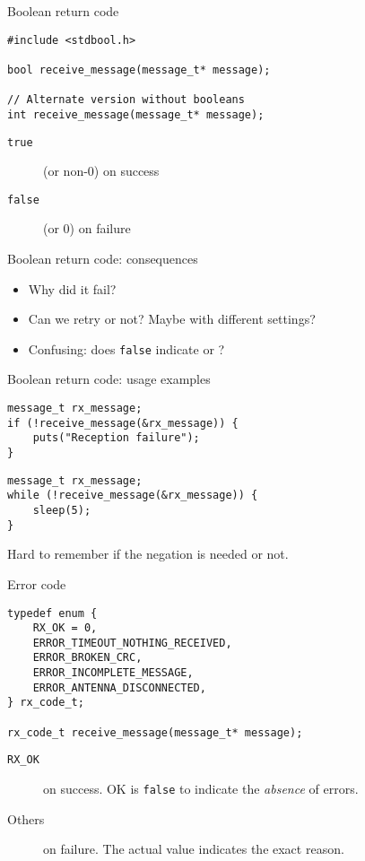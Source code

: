 \documentclass[aspectratio=169,14pt]{beamer}
\begin{document}
\begin{frame}[fragile]{Boolean return code}
\begin{lstlisting}[style=cstyle]
#include <stdbool.h>

bool receive_message(message_t* message);

// Alternate version without booleans
int receive_message(message_t* message);
\end{lstlisting}

\begin{description}
    \item[\texttt{true}] (or non-0) on success
    \item[\texttt{false}] (or 0) on failure
\end{description}
\end{frame}



\begin{frame}[fragile]{Boolean return code: consequences}
\begin{itemize}
    \item[\bad] Why did it fail?
    \item[\bad] Can we retry or not? Maybe with different settings?
    \item[\bad] Confusing: does \texttt{false} indicate  or ?
\end{itemize}
\end{frame}



\begin{frame}[fragile]{Boolean return code: usage examples}
\begin{lstlisting}[style=cstyle]
message_t rx_message;
if (!receive_message(&rx_message)) {
    puts("Reception failure");
}
\end{lstlisting}

\begin{lstlisting}[style=cstyle]
message_t rx_message;
while (!receive_message(&rx_message)) {
    sleep(5);
}
\end{lstlisting}

Hard to remember if the negation is needed or not.
\end{frame}



\begin{frame}[fragile]{Error code}
\begin{lstlisting}[style=cstyle]
typedef enum {
    RX_OK = 0,
    ERROR_TIMEOUT_NOTHING_RECEIVED,
    ERROR_BROKEN_CRC,
    ERROR_INCOMPLETE_MESSAGE,
    ERROR_ANTENNA_DISCONNECTED,
} rx_code_t;

rx_code_t receive_message(message_t* message);
\end{lstlisting}

\begin{description}
    \item[\texttt{RX\_OK}] on success. OK is \texttt{false} to indicate the \textit{absence} of errors.
    \item[Others] on failure. The actual value indicates the exact reason.
\end{description}
\end{frame}
\end{document}
